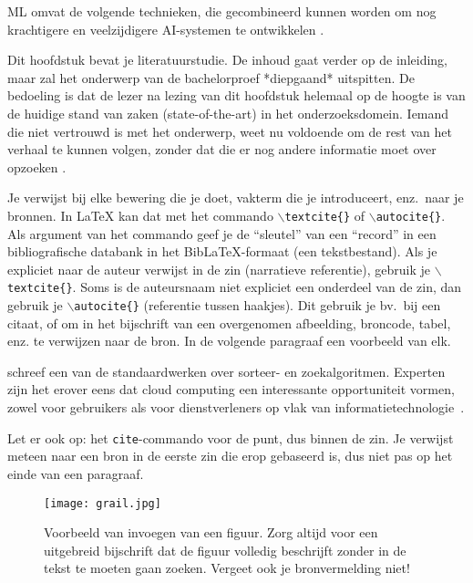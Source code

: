 ML omvat de volgende technieken, die gecombineerd kunnen worden om nog krachtigere en veelzijdigere AI-systemen te ontwikkelen \autocite{Kouassi2023}. 

Dit hoofdstuk bevat je literatuurstudie. De inhoud gaat verder op de inleiding, maar zal het onderwerp van de bachelorproef *diepgaand* uitspitten. De bedoeling is dat de lezer na lezing van dit hoofdstuk helemaal op de hoogte is van de huidige stand van zaken (state-of-the-art) in het onderzoeksdomein. Iemand die niet vertrouwd is met het onderwerp, weet nu voldoende om de rest van het verhaal te kunnen volgen, zonder dat die er nog andere informatie moet over opzoeken \autocite{Pollefliet2011}.

Je verwijst bij elke bewering die je doet, vakterm die je introduceert, enz.\ naar je bronnen. In \LaTeX{} kan dat met het commando \texttt{$\backslash${textcite\{\}}} of \texttt{$\backslash${autocite\{\}}}. Als argument van het commando geef je de ``sleutel'' van een ``record'' in een bibliografische databank in het Bib\LaTeX{}-formaat (een tekstbestand). Als je expliciet naar de auteur verwijst in de zin (narratieve referentie), gebruik je \texttt{$\backslash${}textcite\{\}}. Soms is de auteursnaam niet expliciet een onderdeel van de zin, dan gebruik je \texttt{$\backslash${}autocite\{\}} (referentie tussen haakjes). Dit gebruik je bv.~bij een citaat, of om in het bijschrift van een overgenomen afbeelding, broncode, tabel, enz. te verwijzen naar de bron. In de volgende paragraaf een voorbeeld van elk.

\textcite{Knuth1998} schreef een van de standaardwerken over sorteer- en zoekalgoritmen. Experten zijn het erover eens dat cloud computing een interessante opportuniteit vormen, zowel voor gebruikers als voor dienstverleners op vlak van informatietechnologie~\autocite{Creeger2009}.

Let er ook op: het \texttt{cite}-commando voor de punt, dus binnen de zin. Je verwijst meteen naar een bron in de eerste zin die erop gebaseerd is, dus niet pas op het einde van een paragraaf.

\begin{figure}
  \centering
  \texttt{[image: grail.jpg]}
  \caption[Voorbeeld figuur.]{\label{fig:grail}Voorbeeld van invoegen van een figuur. Zorg altijd voor een uitgebreid bijschrift dat de figuur volledig beschrijft zonder in de tekst te moeten gaan zoeken. Vergeet ook je bronvermelding niet!}
\end{figure}

